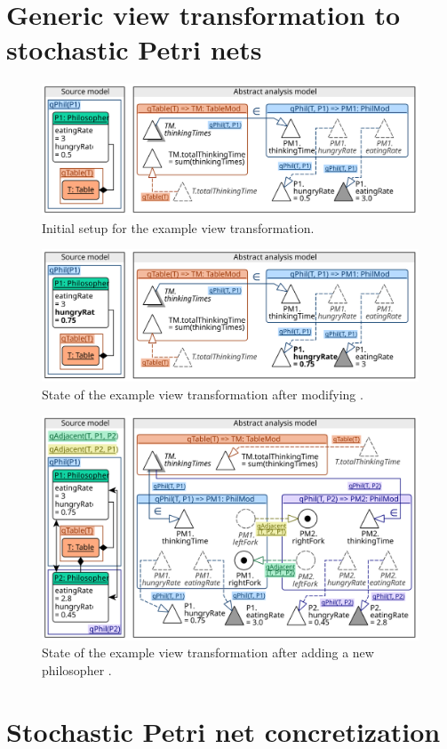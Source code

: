 \section{Generic view transformation to stochastic Petri nets}
\label{chap:transform:view}

\begin{figure}
  \centering
  \includegraphics[scale=0.9]{figures/view_transformation_example_initial}
  \caption{Initial setup for the example view transformation.}
  \label{fig:transform:view-1}
\end{figure}

\begin{figure}
  \centering
  \includegraphics[scale=0.9]{figures/view_transformation_example_2}
  \caption{State of the example view transformation after modifying .}
  \label{fig:transform:view-1}
\end{figure}

\begin{figure}
  \centering
  \includegraphics[scale=0.9]{figures/view_transformation_example}
  \caption{State of the example view transformation after adding a new philosopher .}
  \label{fig:transform:view-3}
\end{figure}

\section{Stochastic Petri net concretization}
\label{chap:transform:concretizer}